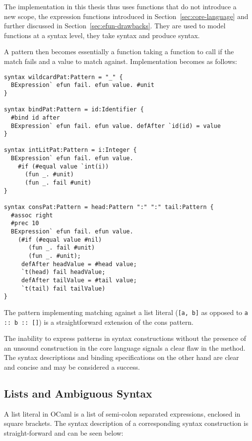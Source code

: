 \documentclass{kththesis}
\begin{document}
The implementation in this thesis thus uses functions that do not introduce a new scope, the expression functions introduced in Section~\ref{sec:core-language} and further discussed in Section~\ref{sec:efun-drawbacks}. They are used to model functions at a syntax level, they take syntax and produce syntax.

A pattern then becomes essentially a function taking a function to call if the match fails and a value to match against. Implementation becomes as follows:

\begin{verbatim}
syntax wildcardPat:Pattern = "_" {
  BExpression` efun fail. efun value. #unit
}

syntax bindPat:Pattern = id:Identifier {
  #bind id after
  BExpression` efun fail. efun value. defAfter `id(id) = value
}

syntax intLitPat:Pattern = i:Integer {
  BExpression` efun fail. efun value.
    #if (#equal value `int(i))
      (fun _. #unit)
      (fun _. fail #unit)
}

syntax consPat:Pattern = head:Pattern ":" ":" tail:Pattern {
  #assoc right
  #prec 10
  BExpression` efun fail. efun value.
    (#if (#equal value #nil)
       (fun _. fail #unit)
       (fun _. #unit);
     defAfter headValue = #head value;
     `t(head) fail headValue;
     defAfter tailValue = #tail value;
     `t(tail) fail tailValue)
}
\end{verbatim}

The pattern implementing matching against a list literal (\texttt{[a, b]} as opposed to \texttt{a :: b :: []}) is a straightforward extension of the cons pattern.

The inability to express patterns in syntax constructions without the presence of an unsound construction in the core language signals a clear flaw in the method. The syntax descriptions and binding specifications on the other hand are clear and concise and may be considered a success.

\subsection{Lists and Ambiguous Syntax}

A list literal in OCaml is a list of semi-colon separated expressions, enclosed in square brackets. The syntax description of a corresponding syntax construction is straight-forward and can be seen below:
\end{document}
